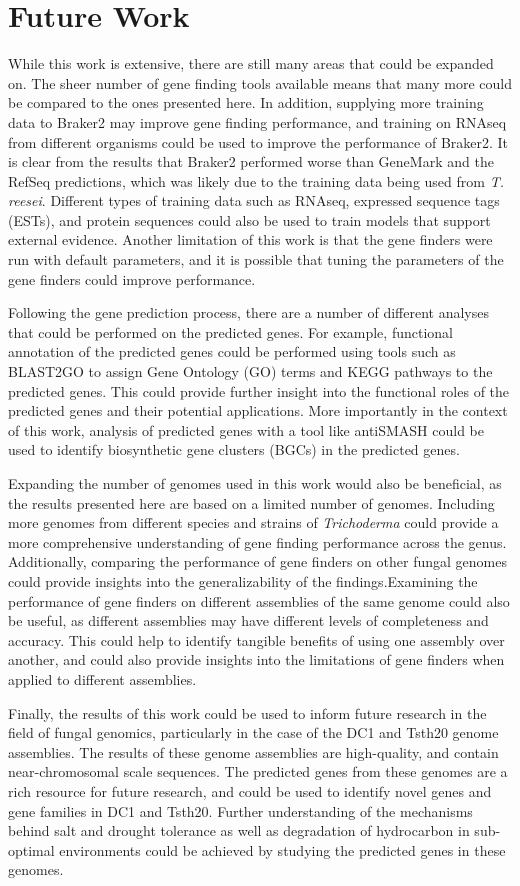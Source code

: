 \section{Future Work}

While this work is extensive, there are still many areas that could be expanded on. The sheer number of gene finding tools available means that many more could be compared to the ones presented here. In addition, supplying more training data to Braker2 may improve gene finding performance, and training on RNAseq from different organisms could be used to improve the performance of Braker2. It is clear from the results that Braker2 performed worse than GeneMark and the RefSeq predictions, which was likely due to the training data being used from \textit{T. reesei}. Different types of training data such as RNAseq, expressed sequence tags (ESTs), and protein sequences could also be used to train models that support external evidence. Another limitation of this work is that the gene finders were run with default parameters, and it is possible that tuning the parameters of the gene finders could improve performance.

Following the gene prediction process, there are a number of different analyses that could be performed on the predicted genes. For example, functional annotation of the predicted genes could be performed using tools such as BLAST2GO to assign Gene Ontology (GO) terms and KEGG pathways to the predicted genes. This could provide further insight into the functional roles of the predicted genes and their potential applications. More importantly in the context of this work, analysis of predicted genes with a tool like antiSMASH could be used to identify biosynthetic gene clusters (BGCs) in the predicted genes. 

Expanding the number of genomes used in this work would also be beneficial, as the results presented here are based on a limited number of genomes. Including more genomes from different species and strains of \textit{Trichoderma} could provide a more comprehensive understanding of gene finding performance across the genus. Additionally, comparing the performance of gene finders on other fungal genomes could provide insights into the generalizability of the findings.Examining the performance of gene finders on different assemblies of the same genome could also be useful, as different assemblies may have different levels of completeness and accuracy. This could help to identify tangible benefits of using one assembly over another, and could also provide insights into the limitations of gene finders when applied to different assemblies.

Finally, the results of this work could be used to inform future research in the field of fungal genomics, particularly in the case of the DC1 and Tsth20 genome assemblies. The results of these genome assemblies are high-quality, and contain near-chromosomal scale sequences. The predicted genes from these genomes are a rich resource for future research, and could be used to identify novel genes and gene families in DC1 and Tsth20. Further understanding of the mechanisms behind salt and drought tolerance as well as degradation of hydrocarbon in sub-optimal environments could be achieved by studying the predicted genes in these genomes. 
